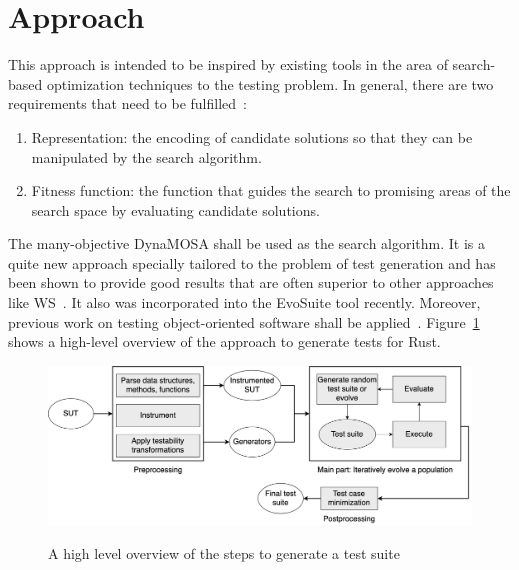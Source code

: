 \documentclass{article}
\begin{document}
\section{Approach}
This approach is intended to be inspired by existing tools in the area of search-based optimization techniques to the testing problem. In general, there are two requirements that need to be fulfilled~\cite{Harman2001}:
\begin{enumerate}
    \item Representation: the encoding of candidate solutions so that they can be manipulated by the search algorithm.
    \item Fitness function: the function that guides the search to promising areas of the search space by evaluating candidate solutions.
\end{enumerate}
The many-objective \ac{DynaMOSA} shall be used as the search algorithm. It is a quite new approach specially tailored to the problem of test generation and has been shown to provide good results that are often superior to other approaches like \ac{WS}~\cite{Campos2017}. It also was incorporated into the EvoSuite tool recently. Moreover, previous work on testing object-oriented software shall be applied~\cite{Tonella2004,Fraser2012}. Figure~\ref{fig:overview} shows a high-level overview of the approach to generate tests for Rust. 

\begin{figure}[h]
\caption{A high level overview of the steps to generate a test suite}
\centering
\includegraphics[width=\textwidth]{overview}
\label{fig:overview}
\end{figure}
\end{document}
